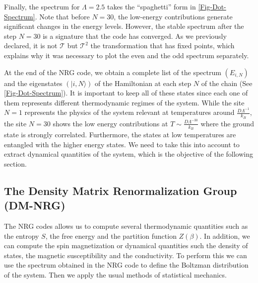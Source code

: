 Finally, the spectrum for $\Lambda = 2.5$ takes the ``spaghetti'' form in \ref{Fig-Dot-Spectrum}.  Note that before $N=30$, the low-energy contributions generate significant changes in the energy levels.  However, the stable spectrum after the step $N=30$ is a signature that the code has converged. As we previously declared, it is not $\mathcal{T}$ but $\mathcal{T}^2$ the transformation that has fixed points, which explains why it was necessary to plot the even and the odd spectrum separately.



At the end of the NRG code, we obtain a complete list of the spectrum $(E_{i, N})$ and the eigenstates $(\vert i , N \rangle)$ of the Hamiltonian at each step $N$ of the chain (See \ref{Fig-Dot-Spectrum}). It is important to keep all of these states since each one of them represents different thermodynamic regimes of the system. While the site $N=1$ represents the physics of the system relevant at temperatures around $\frac{D \Lambda^{-1}}{k_B }$, the site $N=30$ shows the low energy contributions at $T \sim \frac{D \Lambda^{-30}}{k_B }$ where the ground state is strongly correlated. Furthermore, the states at low temperatures are entangled with the higher energy states. We need to take this into account to extract dynamical quantities of the system, which is the objective of the following section. 



\subsection{The Density Matrix Renormalization Group (DM-NRG) \label{subsec:DM-NRG}}
The NRG codes allows us to compute several thermodynamic quantities such as the entropy $S$, the free energy and the partition function $Z(\beta)$. In addition, we can compute the spin magnetization or dynamical quantities such  the density of states, the magnetic susceptibility and the conductivity. To perform this we can use the spectrum obtained in the NRG code to define the Boltzman distribution of the system. Then we apply the usual methods of statistical mechanics.  

